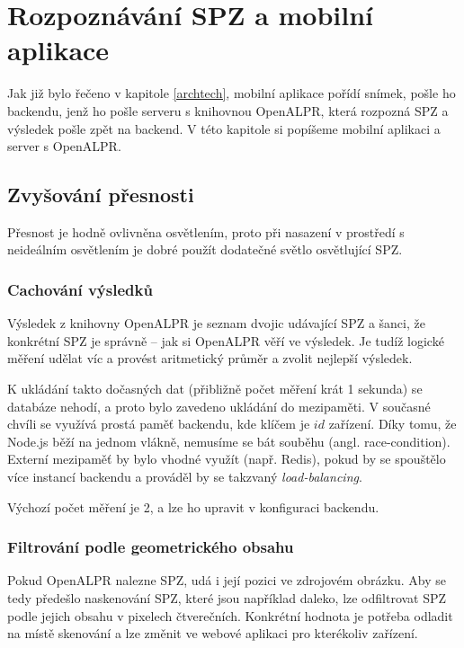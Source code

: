 
\chapter{Rozpoznávání SPZ a mobilní aplikace}

\noindent
Jak již bylo řečeno v kapitole \ref{archtech}, mobilní aplikace pořídí snímek,
pošle ho backendu, jenž ho pošle serveru s knihovnou OpenALPR, která
rozpozná SPZ a výsledek pošle zpět na backend. V této kapitole si popíšeme
mobilní aplikaci a server s OpenALPR.

\section{Zvyšování přesnosti} \label{reco_params}

\noindent
Přesnost je hodně ovlivněna osvětlením, proto při nasazení v prostředí s neideálním
osvětlením je dobré použít dodatečné světlo osvětlující SPZ.

\subsection{Cachování výsledků}

\noindent
Výsledek z knihovny OpenALPR je seznam dvojic udávající SPZ a šanci, že konkrétní SPZ je správně --
jak si OpenALPR věří ve výsledek. Je tudíž logické měření udělat víc a provést aritmetický průměr a
zvolit nejlepší výsledek.

K ukládání takto dočasných dat (přibližně počet měření krát 1 sekunda) se databáze nehodí, a proto
bylo zavedeno ukládání do mezipaměti. V současné chvíli se využívá prostá paměť backendu,
kde klíčem je $id$ zařízení. Díky tomu, že Node.js běží na jednom vlákně, nemusíme se bát souběhu
(angl. race-condition). Externí mezipaměť by bylo vhodné využít (např. Redis), pokud by se spouštělo více
instancí backendu a prováděl by se takzvaný \textit{load-balancing}.

Výchozí počet měření je 2, a lze ho upravit v konfiguraci backendu.

\subsection{Filtrování podle geometrického obsahu}

\noindent
Pokud OpenALPR nalezne SPZ, udá i její pozici ve zdrojovém obrázku.
Aby se tedy předešlo naskenování SPZ, které jsou například daleko, lze odfiltrovat SPZ
podle jejich obsahu v pixelech čtverečních. Konkrétní hodnota je potřeba odladit na místě skenování a
lze změnit ve webové aplikaci pro kterékoliv zařízení.

